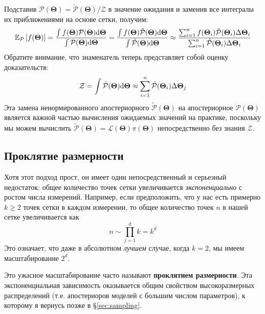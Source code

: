 \documentclass[12pt, titlepage]{article}
\newcommand{\deriv}{\ensuremath{{\rm d}}}  %
\newcommand{\meanwrt}[2]{\ensuremath{\mathbb{E}_{{#2}}\left[{#1}\right]}}
\newcommand{\params}{\ensuremath{\boldsymbol\Theta}}
\newcommand{\likelihood}{\ensuremath{\mathcal{L}}}
\newcommand{\prior}{\ensuremath{\pi}}
\newcommand{\posterior}{\ensuremath{\mathcal{P}}}
\newcommand{\evidence}{\ensuremath{\mathcal{Z}}}
\begin{document}
Подставив $\posterior(\params) = \tilde{\posterior}(\params)/\evidence$ в значение ожидания и заменив все интегралы их приближениями на основе сетки, получим:
\begin{equation} \label{eqn:exp_grid}
    \meanwrt{f(\params)}{\posterior}
    = \frac{\int f(\params) {\posterior}(\params) \deriv \params}
    {\int {\posterior}(\params) \deriv \params}
    = \frac{\int f(\params) \tilde{\posterior}(\params) \deriv \params}
    {\int \tilde{\posterior}(\params) \deriv \params}
    \approx \frac{\sum_{i=1}^{n} f(\params_i) 
    \tilde{\posterior}(\params_i) \Delta \params_i}
    {\sum_{i=1}^{n}\tilde{\posterior}(\params_i) \Delta \params_i}
\end{equation}
Обратите внимание, что знаменатель теперь представляет собой оценку доказательств:
\begin{equation}
    \evidence 
    = \int \tilde{\posterior}(\params) \deriv \params
    \approx \sum_{i=1}^{n} \tilde{\posterior}(\params_i) \Delta \params_j
\end{equation}
Эта замена ненормированного апостериорного $\tilde{\posterior}(\params)$ на апостериорное $\posterior(\params)$ является важной частью вычисления ожидаемых значений на практике, поскольку мы можем вычислить $\tilde{\posterior}(\params) = \likelihood(\params) \prior(\params)$ непосредственно без знания $\evidence$.

\subsection{Проклятие размерности} \label{subsec:curse}

Хотя этот подход прост, он имеет один непосредственный и серьезный недостаток: общее количество точек сетки увеличивается \textit{экспоненциально} с ростом числа измерений. Например, если предположить, что у нас есть примерно $k \geq 2$ точек сетки в каждом измерении, то общее количество точек $n$ в нашей сетке увеличивается как
\begin{equation}
    n \sim \prod_{j=1}^{d} k = k^d
\end{equation}
Это означает, что даже в абсолютном \textit{лучшем} случае, когда $k=2$, мы имеем масштабирование $2^d$.

Это ужасное масштабирование часто называют \textbf{проклятием размерности}. Эта экспоненциальная зависимость оказывается общим свойством высокоразмерных распределений (т.е. апостериоров моделей с большим числом параметров), к которому я вернусь позже в \S\ref{sec:sampling}.
\end{document}
